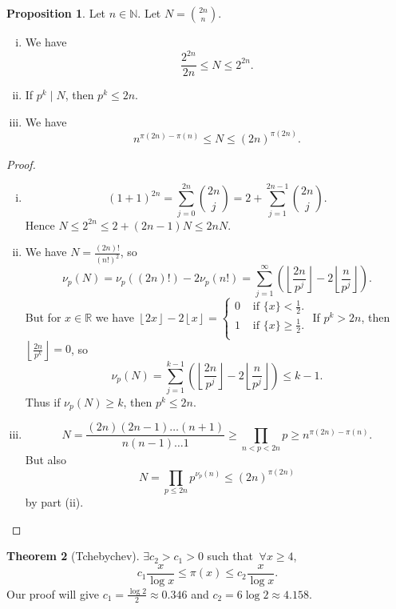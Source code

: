 \documentclass{article}
\theoremstyle{definition}
\newtheorem{theorem}{Theorem}[section]
\newtheorem{prop}[theorem]{Proposition}
\begin{document}
\begin{prop}\label{5.13}
    Let $n \in \mathbb{N}$. Let $N={{2n}\choose{n}}$.
    \begin{enumerate}[(i)]
        \item We have $$\frac{2^{2n}}{2n}\le N\le 2^{2n}.$$
        \item If $p^k \mid N$, then $p^k\le 2n$.
        \item We have $$n^{\pi(2n)-\pi(n)}\le N \le (2n)^{\pi(2n)}.$$
    \end{enumerate}
\end{prop}
\begin{proof}
    \begin{enumerate}[(i)]
        \item $$(1+1)^{2n}=\sum_{j=0}^{2n} {{2n}\choose{j}} = 2 + \sum_{j=1}^{2n-1} {{2n}\choose{j}}.$$
        Hence $N\le 2^{2n} \le 2 +(2n-1)N \le 2nN$.
        \item We have $N=\frac{(2n)!}{(n!)^2}$, so $$\nu_p(N) = \nu_p((2n)!) - 2\nu_p(n!) = \sum_{j=1}^{\infty} \left(\left\lfloor \frac{2n}{p^j} \right\rfloor- 2\left\lfloor \frac{n}{p^j} \right\rfloor\right).$$
        But for $x \in \mathbb{R}$ we have $\left\lfloor 2x \right\rfloor- 2 \left\lfloor x \right\rfloor = \begin{cases}
            0 &\text{ if } \{x\}<\frac{1}{2}. \\
            1 &\text{ if } \{x\}\ge \frac{1}{2}. \\
        \end{cases}$
        If $p^k>2n$, then $\left\lfloor \frac{2n}{p^k} \right\rfloor=0$, so \[
        \nu_p(N) = \sum_{j=1}^{k-1} \left(\left\lfloor \frac{2n}{p^j} \right\rfloor- 2\left\lfloor \frac{n}{p^j} \right\rfloor\right) \le k-1.
        \]
        Thus if $\nu_p(N)\ge k$, then $p^k \le 2n$.
        \item \[
        N = \frac{(2n)(2n-1)\ldots(n+1)}{n(n-1)\ldots 1} \ge \prod_{n<p<2n}^{} p \ge n^{\pi(2n)-\pi(n)}. 
        \]
        But also \[
        N=\prod_{p\le 2n}^{} p^{\nu_p(n)} \le (2n)^{\pi(2n)}
        \] by part (ii).
    \end{enumerate}
\end{proof}
\begin{theorem}[Tchebychev]
    $\exists c_2 > c_1 > 0$ such that $~\forall x\ge 4$,
    \[
    c_1 \frac{x}{\log x} \le \pi(x) \le c_2 \frac{x}{\log x}.
    \]
    Our proof will give $c_1 = \frac{\log 2}{2} \approx 0.346$ and $c_2 = 6\log 2 \approx 4.158$.
\end{theorem}
\end{document}
